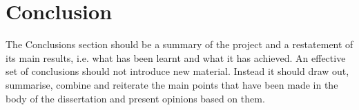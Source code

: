 \section{Conclusion}
The Conclusions section should be a summary of the project and a restatement of its main results,
i.e. what has been learnt and what it has achieved. An effective set of conclusions should not
introduce new material. Instead it should draw out, summarise, combine and reiterate the main
points that have been made in the body of the dissertation and present opinions based on them. 
